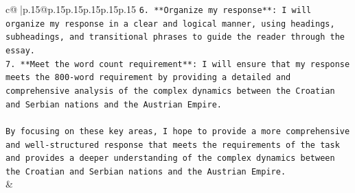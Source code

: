 \documentclass{article}
\begin{document}
{\begin{supertabular}{c@{$\;$}|p{.15\linewidth}@{}p{.15\linewidth}p{.15\linewidth}p{.15\linewidth}p{.15\linewidth}p{.15\linewidth}}
{{{\texttt{6. **Organize my response**: I will organize my response in a clear and logical manner, using headings, subheadings, and transitional phrases to guide the reader through the essay.} \\
\texttt{7. **Meet the word count requirement**: I will ensure that my response meets the 800{-}word requirement by providing a detailed and comprehensive analysis of the complex dynamics between the Croatian and Serbian nations and the Austrian Empire.} \\
\\ 
\texttt{By focusing on these key areas, I hope to provide a more comprehensive and well{-}structured response that meets the requirements of the task and provides a deeper understanding of the complex dynamics between the Croatian and Serbian nations and the Austrian Empire.} \\
            }
        }
    }
    & \\ \\

\end{supertabular}
}
\end{document}
